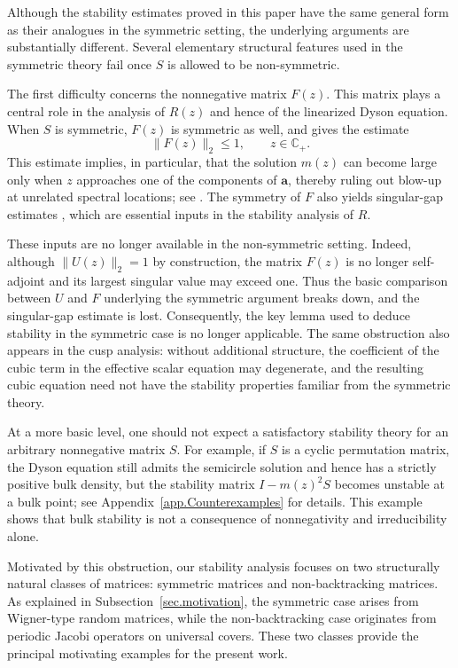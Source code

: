 \documentclass[11pt,twoside, a4paper]{article}
\numberwithin{equation}{section}
\numberwithin{figure}{section}
\theoremstyle{plain} %
\theoremstyle{definition}
\theoremstyle{remark}
\newcommand{\1} {\mspace{1 mu}}
\newcommand{\2} {\mspace{2 mu}}
\begin{document}
Although the stability estimates proved in this paper have the same
general form as their analogues in the symmetric setting, the underlying
arguments are substantially different. Several elementary structural
features used in the symmetric theory fail once \(S\) is allowed to be
non-symmetric.

The first difficulty concerns the nonnegative matrix $F(z)$.
This matrix plays a central role in the analysis of \(R(z)\) and hence of
the linearized Dyson equation. When \(S\) is symmetric, \(F(z)\) is
symmetric as well, and \cite[Lemma 4.6]{AEK2019quadratic} gives the
estimate
\[
    \|F(z)\|_2\le 1,\qquad z\in\mathbb C_+ .
\]
This estimate implies, in particular, that the solution \(m(z)\) can
become large only when \(z\) approaches one of the components of
\(\mathbf a\), thereby ruling out blow-up at unrelated spectral locations;
see \cite[Lemma 4.5]{AEK2019quadratic}. The symmetry of \(F\) also yields
singular-gap estimates \cite[Lemma 5.5 and Lemma 5.6]{AEK2017singularities},
which are essential inputs in the stability analysis of \(R\).

These inputs are no longer available in the non-symmetric setting. Indeed,
although \(\|U(z)\|_2=1\) by construction, the matrix \(F(z)\) is no longer
self-adjoint and its largest singular value may exceed one. Thus the basic
comparison between \(U\) and \(F\) underlying the symmetric argument breaks
down, and the singular-gap estimate is lost. Consequently, the key lemma
\cite[Lemma 5.8]{AEK2017singularities} used to deduce stability in the
symmetric case is no longer applicable. The same obstruction also appears
in the cusp analysis: without additional structure, the coefficient of the
cubic term in the effective scalar equation may degenerate, and the
resulting cubic equation need not have the stability properties familiar
from the symmetric theory.

At a more basic level, one should not expect a satisfactory stability
theory for an arbitrary nonnegative matrix \(S\). For example, if \(S\) is
a cyclic permutation matrix, the Dyson equation still admits the
semicircle solution and hence has a strictly positive bulk density, but
the stability matrix \(I-m(z)^2S\) becomes unstable at a bulk point; see
Appendix~\ref{app.Counterexamples} for details. This example shows that
bulk stability is not a consequence of nonnegativity and irreducibility
alone.

Motivated by this obstruction, our stability analysis focuses on two
structurally natural classes of matrices: symmetric matrices and
non-backtracking matrices. As explained in
Subsection~\ref{sec.motivation}, the symmetric case arises from
Wigner-type random matrices, while the non-backtracking case originates
from periodic Jacobi operators on universal covers. These two classes
provide the principal motivating examples for the present work.
\end{document}
